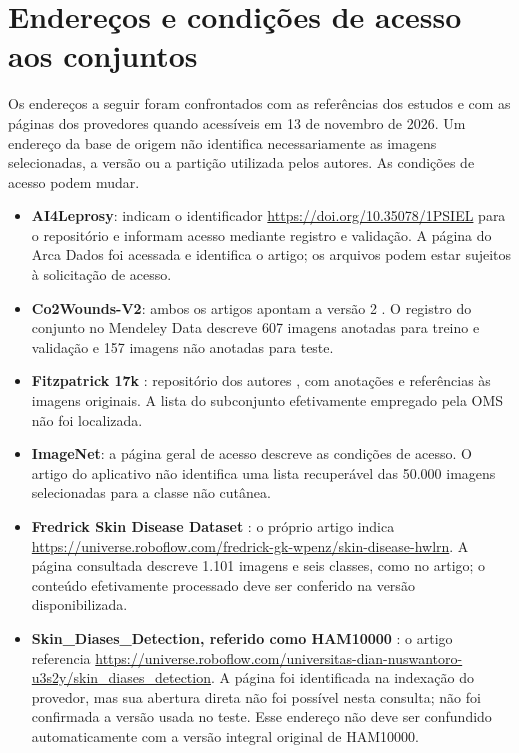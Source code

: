 \section{Endereços e condições de acesso aos conjuntos}

Os endereços a seguir foram confrontados com as referências dos estudos e com as páginas dos provedores quando acessíveis em 13 de novembro de 2026. Um endereço da base de origem não identifica necessariamente as imagens selecionadas, a versão ou a partição utilizada pelos autores. As condições de acesso podem mudar.

\begin{itemize}
    \item \textbf{AI4Leprosy}:  indicam o identificador \url{https://doi.org/10.35078/1PSIEL} para o repositório e informam acesso mediante registro e validação. A página do Arca Dados \cite{arcaAi4leprosy} foi acessada e identifica o artigo; os arquivos podem estar sujeitos à solicitação de acesso.
    \item \textbf{Co2Wounds-V2}: ambos os artigos apontam a versão 2 \cite{mehta2026,sanchez2024}. O registro do conjunto no Mendeley Data \cite{co2woundsDados2024} descreve 607 imagens anotadas para treino e validação e 157 imagens não anotadas para teste.
    \item \textbf{Fitzpatrick 17k} \cite{pons2026}: repositório dos autores \cite{grohFitzpatrick2021}, com anotações e referências às imagens originais. A lista do subconjunto efetivamente empregado pela OMS não foi localizada.
    \item \textbf{ImageNet}: a página geral de acesso \cite{imagenetDownload} descreve as condições de acesso. O artigo do aplicativo \cite{pons2026} não identifica uma lista recuperável das 50.000 imagens selecionadas para a classe não cutânea.
    \item \textbf{Fredrick Skin Disease Dataset} \cite{eita2025}: o próprio artigo indica \url{https://universe.roboflow.com/fredrick-gk-wpenz/skin-disease-hwlrn}. A página consultada \cite{fredrickSkinDisease2025} descreve 1.101 imagens e seis classes, como no artigo; o conteúdo efetivamente processado deve ser conferido na versão disponibilizada.
    \item \textbf{Skin\_Diases\_Detection, referido como HAM10000} \cite{eita2025}: o artigo referencia \url{https://universe.roboflow.com/universitas-dian-nuswantoro-u3s2y/skin_diases_detection}. A página foi identificada na indexação do provedor, mas sua abertura direta não foi possível nesta consulta; não foi confirmada a versão usada no teste. Esse endereço não deve ser confundido automaticamente com a versão integral original de HAM10000.

\end{itemize}
